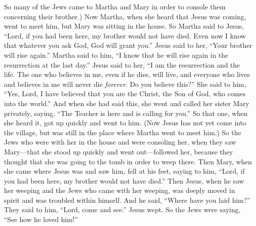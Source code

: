 \begin{biblechapter}
\verse So many of the Jews came to Martha and Mary in order to console them concerning their brother.)
\verse Now Martha, when she heard that Jesus was coming, went to meet him, but Mary was sitting in the house.
\verse So Martha said to Jesus, “Lord, if you had been here, my brother would not have died.
\verse Even now I know that whatever you ask God, God will grant you.”
\verse Jesus said to her, “Your brother will rise again.”
\verse Martha said to him, “I know that he will rise again in the resurrection at the last day.”
\verse Jesus said to her, “I am the resurrection and the life. The one who believes in me, even if he dies, will live,
\verse and everyone who lives and believes in me will never die \textit{forever}. Do you believe this?”
\verse She said to him, “Yes, Lord, I have believed that you are the Christ, the Son of God, who comes into the world.”
 And when she had said this, she went and called her sister Mary privately, saying, “The Teacher is here and is calling for you.”
\verse So that one, when she heard it, got up quickly and went to him.
\verse (Now Jesus has not yet come into the village, but was still in the place where Martha went to meet him.)
\verse So the Jews who were with her in the house and were consoling her, when they saw Mary—that she stood up quickly and went out—followed her, because they thought that she was going to the tomb in order to weep there.
\verse Then Mary, when she came where Jesus was and saw him, fell at his feet, saying to him, “Lord, if you had been here, my brother would not have died.”
\verse Then Jesus, when he saw her weeping and the Jews who came with her weeping, was deeply moved in spirit and was troubled within himself.
\verse And he said, “Where have you laid him?” They said to him, “Lord, come and see.”
\verse Jesus wept.
\verse So the Jews were saying, “See how he loved him!”

\end{biblechapter}
